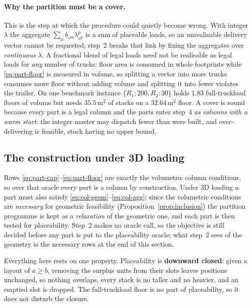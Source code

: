 \paragraph{Why the partition must be a cover.}
This is the step at which the procedure could quietly become wrong.
With integer $\lambda$ the aggregate
$\sum_{\omega}b_{\omega n}\lambda^{p}_{\omega t}$ is a sum of placeable
loads, so an unrealisable delivery vector cannot be requested; step~2
breaks that link by fixing the aggregates over \emph{continuous}
$\lambda$. A fractional blend of legal loads need not be realisable as
legal loads for \emph{any} number of trucks: floor area is consumed in
whole footprints while \eqref{eq:part-floor} is measured in volume, so
splitting a vector into more trucks consumes more floor without adding
volume and splitting it into fewer violates the trailer. On one
benchmark instance $\{R_{1}\!:\!200,R_{2}\!:\!30\}$ holds $1.83$
full-truckload floors of volume but needs $35.5\,\mathrm{m}^{2}$ of
stacks on a $32.64\,\mathrm{m}^{2}$ floor. A cover is sound because
every part is a legal column and the parts enter step~4 \emph{as
columns with a warm start}: the integer master may dispatch fewer than
were built, and over-delivering is feasible, stock having no upper
bound.



\subsection{The construction under 3D loading}
\label{sec:geo3d}

Rows \eqref{eq:part-cap}--\eqref{eq:part-floor} are exactly the
volumetric column conditions, so over that oracle every part is a
column by construction. Under 3D loading a part must also satisfy
\eqref{eq:col-geom}--\eqref{eq:col-agg}; since the volumetric
conditions are \emph{necessary} for geometric feasibility
(Proposition~\ref{prop:inclusion}) the partition programme is kept as a
\emph{relaxation} of the geometric one, and each part is then tested
for placeability. Step~2 makes no oracle call, so the objective is
still decided before any part is put to the placeability oracle; what
step~2 sees of the geometry is the necessary rows at the end of this
section.

Everything here rests on one property. Placeability is \textbf{downward
closed}: given a layout of $a\ge b$, removing the surplus units from
their slots leaves positions unchanged, so nothing overlaps, every
stack is no taller and no heavier, and an emptied slot is dropped. The
full-truckload floor is no part of placeability, so it does not disturb
the closure.

